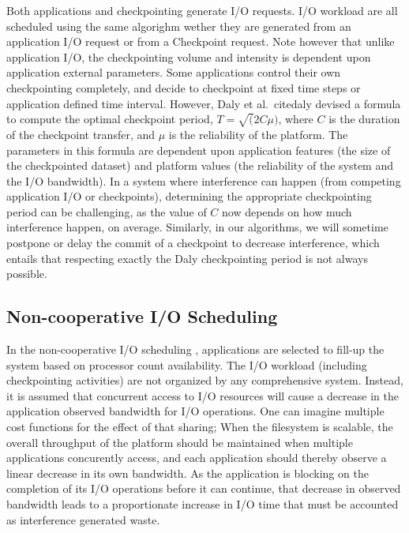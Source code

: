 Both applications and checkpointing generate I/O requests. I/O workload
are all scheduled using the same algorighm wether they
are generated from an application I/O request or from a Checkpoint
request. Note however that unlike application I/O, the checkpointing
volume and intensity is dependent upon application external parameters.
Some applications
control their own checkpointing completely, and decide to checkpoint at
fixed time steps or application defined time interval. However,
Daly et al.~cite{daly} devised a formula to compute the optimal
checkpoint period, $T=\sqrt(2 C \mu)$, where $C$ is the duration of the
checkpoint transfer, and $\mu$ is the reliability of the platform.
The parameters in this formula are dependent upon application features
(the size of the checkpointed dataset) and platform values (the reliability
of the system and the I/O bandwidth). In a system where interference
can happen (from competing application I/O or checkpoints), determining
the appropriate checkpointing period can be challenging, as the value of
$C$ now depends on how much interference happen, on average. Similarly,
in our algorithms, we will sometime postpone or delay the commit of
a checkpoint to decrease interference, which entails that respecting
exactly the Daly checkpointing period is not always possible.

\subsection{Non-cooperative I/O Scheduling}

In the non-cooperative I/O scheduling \nocoop, applications are selected to
fill-up the system based on processor count availability. The I/O
workload (including checkpointing activities) are not organized by any
comprehensive system. Instead, it is assumed that concurrent access
to I/O resources will cause a decrease in the application observed
bandwidth for I/O operations. One can imagine multiple cost functions
for the effect of that sharing; When the filesystem is scalable, the
overall throughput of the platform should be maintained when multiple
applications concurently access, and each application should thereby
observe a linear decrease in its own bandwidth. As the application is
blocking on the completion of its I/O operations before it can continue,
that decrease in observed bandwidth leads to a proportionate increase in
I/O time that must be accounted as interference generated waste.

